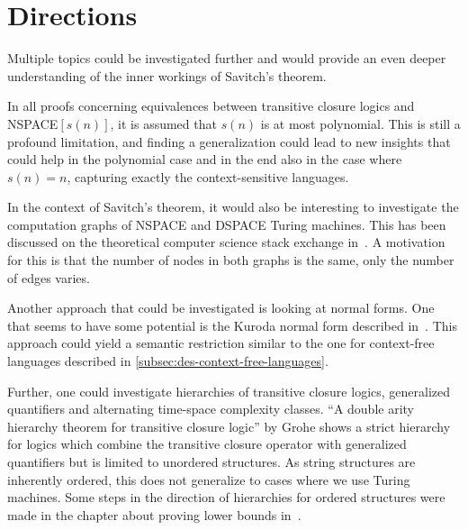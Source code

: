 \section{Directions}\label{sec:directions}
Multiple topics could be investigated further and would provide an even deeper understanding of the inner workings of Savitch's theorem.

In all proofs concerning equivalences between transitive closure logics and NSPACE$[s(n)]$, it is assumed that $s(n)$ is at most polynomial.
This is still a profound limitation, and finding a generalization could lead to new insights that could help in the polynomial case and in the end also in the case where $s(n) = n$, capturing exactly the context-sensitive languages.

In the context of Savitch's theorem, it would also be interesting to investigate the computation graphs of NSPACE and DSPACE Turing machines.
This has been discussed on the theoretical computer science stack exchange in~\cite{Barak2010}.
A motivation for this is that the number of nodes in both graphs is the same, only the number of edges varies.

Another approach that could be investigated is looking at normal forms.
One that seems to have some potential is the Kuroda normal form described in~\cite{Kuroda1964}.
This approach could yield a semantic restriction similar to the one for context-free languages described in \cref{subsec:des-context-free-languages}.

Further, one could investigate hierarchies of transitive closure logics, generalized quantifiers and alternating time-space complexity classes.
``A double arity hierarchy theorem for transitive closure logic''\cite{Grohe1996} by Grohe shows a strict hierarchy for logics which combine the transitive closure operator with generalized quantifiers but is limited to unordered structures.
As string structures are inherently ordered, this does not generalize to cases where we use Turing machines.
Some steps in the direction of hierarchies for ordered structures were made in the chapter about proving lower bounds in~\cite{descriptive-complexity}.